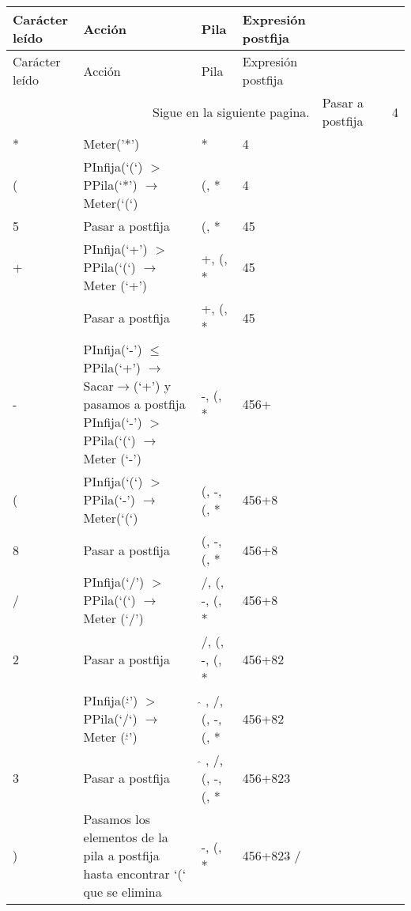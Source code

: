 \documentclass[12pt ]{article}
\begin{document}
 \begin{longtable}[h]{p{2cm} p{5cm} p{2.5cm} p{2.5 cm}}
 	
 	\hline
 	
 	\rowcolor{LightBlue2} Carácter leído &Acción& Pila&Expresión postfija  \\
 	\hline\hline
 	\endfirsthead
 	
 	\hline
 	\rowcolor{LightBlue2} Carácter leído &Acción& Pila&Expresión postfija \\
 	\hline\hline
 	\endhead
 	
 	\multicolumn{4}{r}{Sigue en la siguiente pagina.}
 	\endfoot
 	
 	\endlastfoot
 	
 	
 	4 & Pasar a postfija & & 4 \\ 
 	\rowcolor{gray!20}* &Meter('*')&*& 4 \\
 	
 	(& 	PInfija(‘(‘) $>$ PPila(‘*’) $\rightarrow$ Meter(‘(‘) & (, *	& 4	\\
 	\rowcolor{gray!20} 5&	Pasar a postfija & (, *	& 45\\
 	
 	
 	
 	+&PInfija(‘+’) $>$ PPila(‘(‘) $\rightarrow$ Meter (‘+’) &+, (, * 	&	45 \\
 	\rowcolor{gray!20} &	Pasar a postfija&+, (, * 	&45\\
 	
 	
 	-& PInfija(‘-’) $\leq$ PPila(‘+’)
 	$\rightarrow$ Sacar$\rightarrow$(‘+’) y pasamos a postfija
 	PInfija(‘-’) $>$ PPila(‘(‘) $\rightarrow$ Meter (‘-’) 	&	-, (, * & 456+	\\
 	\rowcolor{gray!20}( & PInfija(‘(‘) $>$ PPila(‘-’) $\rightarrow$ Meter(‘(‘) 	&(, -, (, * 	&456+8\\
 	
 	
 8	&Pasar a postfija	&(, -, (, * 	&456+8	\\
 	\rowcolor{gray!20} /&	PInfija(‘/’) $>$ PPila(‘(‘) $\rightarrow$ Meter (‘/’) & /, (, -, (, *	&456+8\\
 	
 	
 2	& Pasar a postfija	& /, (, -, (, *	&456+82	\\
 	\rowcolor{gray!20}$\hat{{}}$ & PInfija(‘$\hat{{}}$’) $>$ PPila(‘/‘) $\rightarrow$ Meter (‘$\hat{{}}$’) 	& $\hat{{}}$ , /, (, -, (, * 	&456+82\\
 	
 	
 3	&Pasar a postfija	& $\hat{{}}$ , /, (, -, (, * 	&456+823	\\
 	\rowcolor{gray!20} ) & Pasamos los elementos de la pila a postfija hasta encontrar ‘(‘ que se elimina 	&-, (, *	&456+823\hspace{0.2 cm}$\hat{{}}$\hspace{0.2 cm} /\\
 	

\end{longtable}
\end{document}
